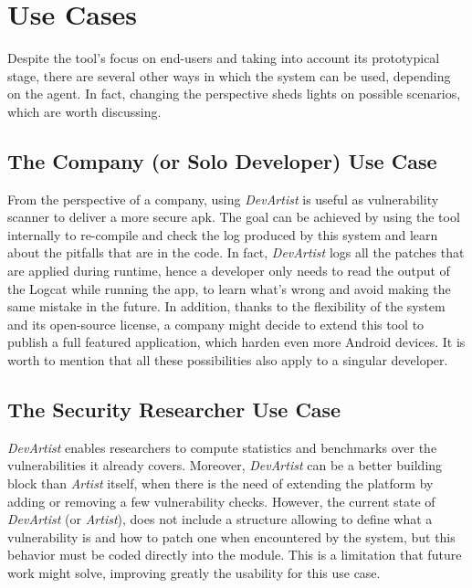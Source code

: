\section{Use Cases}
Despite the tool's focus on end-users and taking into account its prototypical stage, there are several other ways in which the system can be used, depending on the agent. In fact, changing the perspective sheds lights on possible scenarios, which are worth discussing. 

\subsection{The Company (or Solo Developer) Use Case}
From the perspective of a company, using \emph{DevArtist} is useful as vulnerability scanner to deliver a more secure apk. The goal can be achieved by using the tool internally to re-compile and check the log produced by this system and learn about the pitfalls that are in the code. In fact, \emph{DevArtist} logs all the patches that are applied during runtime, hence a developer only needs to read the output of the Logcat while running the app, to learn what's wrong and avoid making the same mistake in the future. In addition, thanks to the flexibility of the system and its open-source license, a company might decide to extend this tool to publish a full featured application, which harden even more Android devices. It is worth to mention that all these possibilities also apply to a singular developer.

\subsection{The Security Researcher Use Case}
\emph{DevArtist} enables researchers to compute statistics and benchmarks over the vulnerabilities it already covers. Moreover, \emph{DevArtist} can be a better building block than \emph{Artist} itself, when there is the need of extending the platform by adding or removing a few vulnerability checks. However, the current state of \emph{DevArtist} (or \emph{Artist}), does not include a structure allowing to define what a vulnerability is and how to patch one when encountered by the system, but this behavior must be coded directly into the module. This is a limitation that future work might solve, improving greatly the usability for this use case.

